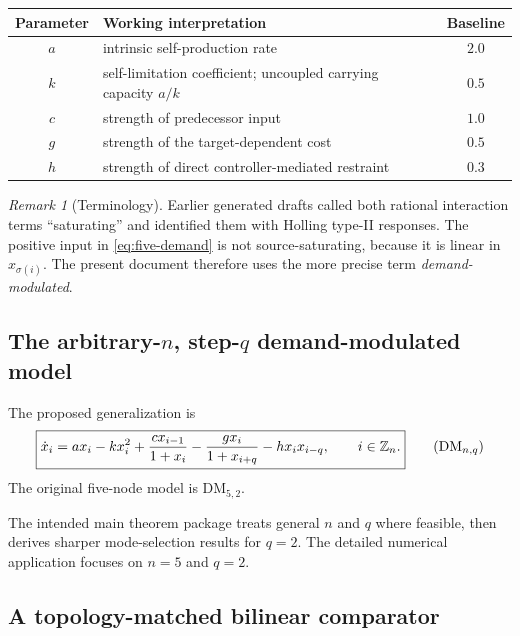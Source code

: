 \documentclass[11pt, reqno]{amsart}
\theoremstyle{definition}
\theoremstyle{remark}
\newtheorem{remark}[theorem]{Remark}
\newcommand{\Z}{\mathbb{Z}}
\newcommand{\DM}{\mathrm{DM}}
\begin{document}
	\begin{center}
		\begin{tabular}{c p{9.2cm} c}
			\toprule
			Parameter & Working interpretation & Baseline \\
			\midrule
			$a$ & intrinsic self-production rate & $2.0$ \\
			$k$ & self-limitation coefficient; uncoupled carrying capacity $a/k$ & $0.5$ \\
			$c$ & strength of predecessor input & $1.0$ \\
			$g$ & strength of the target-dependent cost & $0.5$ \\
			$h$ & strength of direct controller-mediated restraint & $0.3$ \\
			\bottomrule
		\end{tabular}
	\end{center}
	
	\begin{remark}[Terminology]
		Earlier generated drafts called both rational interaction terms ``saturating''
		and identified them with Holling type-II responses.  The positive input in
		\eqref{eq:five-demand} is not source-saturating, because it is linear in
		$x_{\sigma(i)}$.  The present document therefore uses the more precise term
		\emph{demand-modulated}.
	\end{remark}
	
	\subsection{The arbitrary-$n$, step-$q$ demand-modulated model}
	
	The proposed generalization is
	\begin{equation}
		\label{eq:DMnq}
		\boxed{
			\dot x_i
			=
			a x_i-kx_i^2
			+\frac{c x_{i-1}}{1+x_i}
			-\frac{g x_i}{1+x_{i+q}}
			-h x_i x_{i-q},
			\qquad i\in\Z_n.
		}
		\tag{$\DM_{n,q}$}
	\end{equation}
	The original five-node model is $\DM_{5,2}$.
	
	The intended main theorem package treats general $n$ and $q$ where feasible,
	then derives sharper mode-selection results for $q=2$.  The detailed numerical
	application focuses on $n=5$ and $q=2$.
	
	\subsection{A topology-matched bilinear comparator}
	
\end{document}
